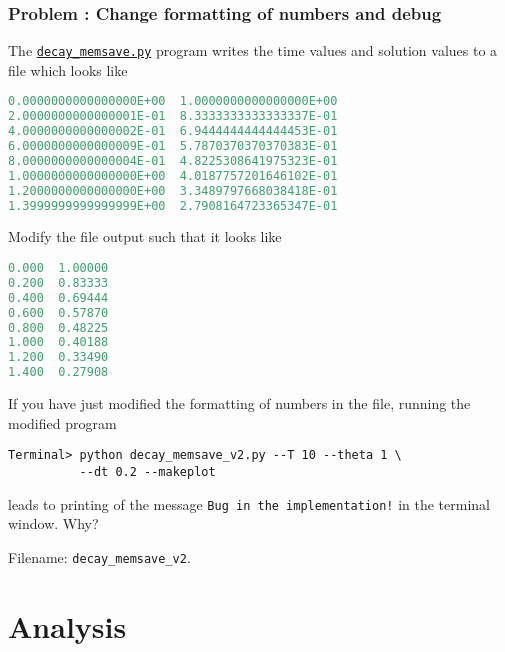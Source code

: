 \documentclass[graybox,sectrefs,envcountresetchap,open=right,final]{svmonodo}
\newenvironment{doconceexercise}{}{}
\newcounter{doconceexercisecounter}
\begin{document}
\begin{doconceexercise}

\subsection*{Problem \thedoconceexercisecounter: Change formatting of numbers and debug}

\label{decay:exer:inexact:output}

The \href{{http://tinyurl.com/ofkw6kc/alg/decay_memsave.py}}{\nolinkurl{decay_memsave.py}} program
writes the time values and solution values to a file which looks
like
\begin{lstlisting}[language=Python,style=blue1_bluegreen]
0.0000000000000000E+00  1.0000000000000000E+00
2.0000000000000001E-01  8.3333333333333337E-01
4.0000000000000002E-01  6.9444444444444453E-01
6.0000000000000009E-01  5.7870370370370383E-01
8.0000000000000004E-01  4.8225308641975323E-01
1.0000000000000000E+00  4.0187757201646102E-01
1.2000000000000000E+00  3.3489797668038418E-01
1.3999999999999999E+00  2.7908164723365347E-01
\end{lstlisting}
Modify the file output such that it looks like
\begin{lstlisting}[language=Python,style=gray]
0.000  1.00000
0.200  0.83333
0.400  0.69444
0.600  0.57870
0.800  0.48225
1.000  0.40188
1.200  0.33490
1.400  0.27908
\end{lstlisting}
If you have just modified the formatting of numbers in the file,
running the modified program
\begin{Verbatim}[frame=lines,label=\fbox{{\tiny Terminal}},framesep=2.5mm,framerule=0.7pt,fontsize=\fontsize{9pt}{9pt}]
Terminal> python decay_memsave_v2.py --T 10 --theta 1 \ 
          --dt 0.2 --makeplot
\end{Verbatim}
leads to printing of the message \Verb?Bug in the implementation!? in the
terminal window. Why?


\noindent Filename: \Verb!decay_memsave_v2!.

\end{doconceexercise}


\chapter{Analysis}
\label{decay:analysis}
\end{document}
